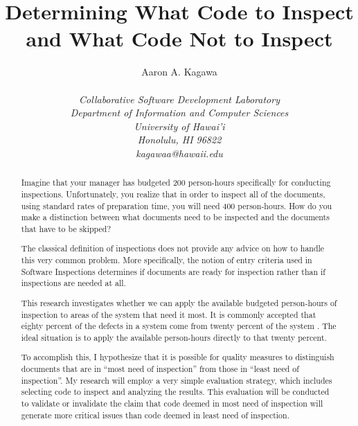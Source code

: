 \documentclass[11pt,twocolumn]{article}
\begin{document}
\title{Determining What Code to Inspect and What Code Not to Inspect}

\author{\protect\begin{tabular}{ccc}
Aaron A. Kagawa \\
\end{tabular}\\
\em  Collaborative Software Development Laboratory \\
\em  Department of Information and Computer Sciences \\
\em  University of Hawai'i \\
\em  Honolulu, HI 96822 \\
\em  kagawaa@hawaii.edu}
\maketitle
\thispagestyle{empty}

\begin{abstract}  %
Imagine that your manager has budgeted 200 person-hours specifically for
conducting inspections.  Unfortunately, you realize that in order to
inspect all of the documents, using standard rates of preparation time, you
will need 400 person-hours. How do you make a distinction between what
documents need to be inspected and the documents that have to be skipped?
  
The classical definition of inspections does not provide any advice on how
to handle this very common problem. More specifically, the notion of entry
criteria used in Software Inspections determines if documents are ready for
inspection \cite{Ebenau94} rather than if inspections are needed at all.

This research investigates whether we can apply the available budgeted
person-hours of inspection to areas of the system that need it most.  It is
commonly accepted that eighty percent of the defects in a system come from
twenty percent of the system \cite{Boehm01}. The ideal situation is to
apply the available person-hours directly to that twenty percent.

To accomplish this, I hypothesize that it is possible for quality measures
to distinguish documents that are in ``most need of inspection'' from those
in ``least need of inspection''. My research will employ a very simple
evaluation strategy, which includes selecting code to inspect and analyzing
the results. This evaluation will be conducted to validate or invalidate
the claim that code deemed in most need of inspection will generate more
critical issues than code deemed in least need of inspection.
\end{abstract}
\end{document}
